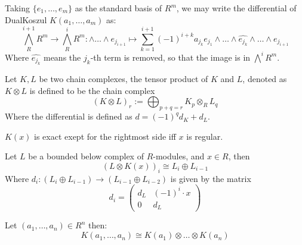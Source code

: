 \begin{proposition}
	\label{prop:diff_of_dual_koszul}
	Taking $\{e_1, \dots, e_m\}$ as the standard basis of $R^m$, we may write the differential of DualKoszul $K(a_1, \dots, a_m)$ as:
	$$\bigwedge^{i+1}_R R^m \to \bigwedge^i_R R^m: \wedge \dots \wedge e_{j_{i+1}} \mapsto \sum_{k=1}^{i+1} (-1)^{i+k} a_{j_k} e_{j_{1}} \wedge \dots \wedge \widehat{e_{j_k}} \wedge \dots \wedge e_{j_{i+1}}$$
	Where $\widehat{e_{j_k}}$ means the $j_k$-th term is removed, so that the image is in $\bigwedge^{i} R^m$.
\end{proposition}

\begin{definition}
	\label{def:complex_tensor_product}
	Let $K, L$ be two chain complexes, the tensor product of $K$ and $L$, denoted as $K \otimes L$ is defined to be the chain complex
	$$(K \otimes L)_r := \bigoplus_{p + q = r}K_p \otimes_R L_q$$
	Where the differential is defined as $d = (-1)^q d_K + d_L$.
\end{definition}

\begin{lemma}
	\label{lem:koszul_of_length_2}
	$K(x)$ is exact exept for the rightmost side iff $x$ is regular.
\end{lemma}

\begin{lemma}
	\label{lem:koszul_tensor_as_mapping_cone}
	Let $L$ be a bounded below complex of $R$-modules, and $x \in R$, then
	$$(L \otimes K(x))_i \cong L_i \oplus L_{i-1}$$
	Where $d_i: (L_i \oplus L_{i-1}) \to (L_{i-1}\oplus L_{i-2})$ is given by the matrix
	$$d_i = \begin{pmatrix}d_L & (-1)^i \cdot x \\ 0 & d_L\end{pmatrix}$$
\end{lemma}

\begin{theorem}
	\label{thm:long_koszul_build_by_tensoring}
	Let $(a_1, \dots, a_n) \in R^n$ then:
	$$K(a_1, \dots, a_n) \cong K(a_1) \otimes \dots \otimes K(a_n)$$
\end{theorem}


